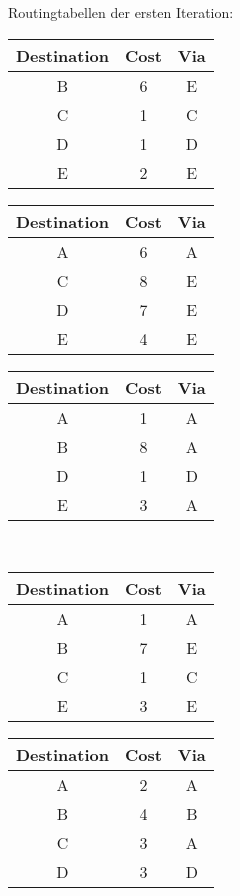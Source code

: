 \documentclass[a4paper,
			llpt,
			solution,
			accentcolor=tud2d,
			colorbacktitle
			]
			{tudexercise}
\newcommand{\8}{$\infty$}
\begin{document}
Routingtabellen der ersten Iteration:
\begin{multicols}{3}
\begin{tabular}{c|c|c}
Destination & Cost & Via \\ \hline
B           & 6    & E   \\
C           &
\colorbox{litegray}{\textcolor{tud2d}{1}}    & \colorbox{litegray}{\textcolor{tud2d}{C}}   \\
D           & 1    & D   \\
E           & 2    & E   \\
\end{tabular}
\vfill \columnbreak
\begin{tabular}{c|c|c}
Destination & Cost & Via \\ \hline
A           & 6    & A   \\
C           &
\colorbox{litegray}{\textcolor{tud2d}{8}}   & \colorbox{litegray}{\textcolor{tud2d}{E}}   \\
D           & 7    & E   \\
E           & 4    & E   \\
\end{tabular}
\vfill \columnbreak
\begin{tabular}{c|c|c}
Destination & Cost & Via \\ \hline
A           &
\colorbox{litegray}{\textcolor{tud2d}{1}}    & \colorbox{litegray}{\textcolor{tud2d}{A}}   \\
B           &
\colorbox{litegray}{\textcolor{tud2d}{8}}    & \colorbox{litegray}{\textcolor{tud2d}{A}}   \\
D           & 1    & D   \\
E           &
\colorbox{litegray}{\textcolor{tud2d}{3}}    & \colorbox{litegray}{\textcolor{tud2d}{A}}   \\
\end{tabular}
\end{multicols}
~\\
\begin{multicols}{3}
\begin{tabular}{c|c|c}
Destination & Cost & Via \\ \hline
A           & 1    & A   \\
B           & 7    & E   \\
C           & 1    & C   \\
E           & 3    & E   \\
\end{tabular}
\vfill \columnbreak
\begin{tabular}{c|c|c}
Destination & Cost & Via \\ \hline
A           & 2    & A   \\
B           & 4    & B   \\
C           &
\colorbox{litegray}{\textcolor{tud2d}{3}}    & \colorbox{litegray}{\textcolor{tud2d}{A}}  \\
D           & 3    & D   \\
\end{tabular}
\end{multicols}
\end{document}
